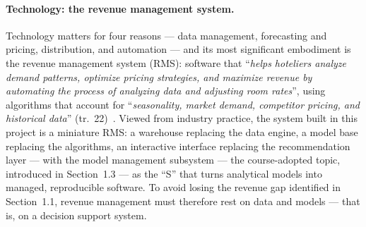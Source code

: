 \paragraph{Technology: the revenue management system.}
Technology matters for four reasons --- data management, forecasting and pricing, distribution, and automation --- and its most significant embodiment is the revenue management system (RMS): software that ``\emph{helps hoteliers analyze demand patterns, optimize pricing strategies, and maximize revenue by automating the process of analyzing data and adjusting room rates}'', using algorithms that account for ``\emph{seasonality, market demand, competitor pricing, and historical data}'' (tr.~22)~\cite{amadeus2023}. Viewed from industry practice, the system built in this project is a miniature RMS: a warehouse replacing the data engine, a model base replacing the algorithms, an interactive interface replacing the recommendation layer --- with the model management subsystem --- the course-adopted topic, introduced in Section~1.3 --- as the ``S'' that turns analytical models into managed, reproducible software. To avoid losing the revenue gap identified in Section~1.1, revenue management must therefore rest on data and models --- that is, on a decision support system.
